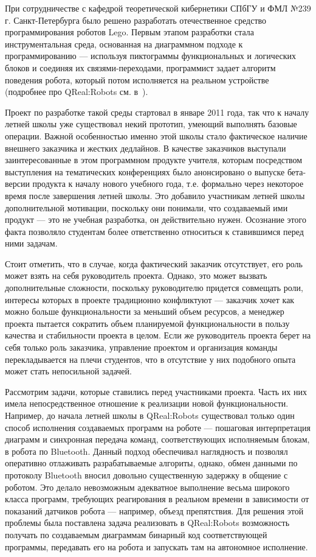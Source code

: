 \documentclass[a4paper]{article}
\begin{document}
При сотрудничестве с кафедрой теоретической кибернетики СПбГУ и ФМЛ №239 г. Санкт-Петербурга было решено разработать отечественное средство программирования роботов Lego. Первым этапом разработки стала инструментальная среда, основанная на диаграммном подходе к программированию --- используя пиктограммы функциональных и логических блоков и соединяя их связями-переходами, программист задает алгоритм поведения робота, который потом исполняется на реальном устройстве (подробнее про QReal:Robots см. в~\cite{robots}).

Проект по разработке такой среды стартовал в январе 2011 года, так что к началу летней школы уже существовал некий прототип, умеющий выполнять базовые операции. Важной особенностью именно этой школы стало фактическое наличие внешнего заказчика и жестких дедлайнов. В качестве заказчиков выступали заинтересованные в этом программном продукте учителя, которым посредством выступления на тематических конференциях было анонсировано о выпуске бета-версии продукта к началу нового учебного года, т.е. формально через некоторое время после завершения летней школы. Это добавило участникам летней школы дополнительной мотивации, поскольку они понимали, что создаваемый ими продукт --- это не учебная разработка, он действительно нужен. Осознание этого факта позволяло студентам более ответственно относиться к ставившимся перед ними задачам. 

Стоит отметить, что в случае, когда фактический заказчик отсутствует, его роль может взять на себя руководитель проекта. Однако, это может вызвать дополнительные сложности, поскольку руководителю придется совмещать роли, интересы которых в проекте традиционно конфликтуют --- заказчик хочет как можно больше функциональности за меньший объем ресурсов, а менеджер проекта пытается сократить объем планируемой функциональности в пользу качества и стабильности проекта в целом. Если же руководитель проекта берет на себя только роль заказчика, управление проектом и организация команды перекладывается на плечи студентов, что в отсутствие у них подобного опыта может стать непосильной задачей.

Рассмотрим задачи, которые ставились перед участниками проекта. Часть их них имела непосредственное отношение к реализации новой функциональности. Например, до начала летней школы в QReal:Robots существовал только один способ исполнения создаваемых программ на роботе --- пошаговая интерпретация диаграмм и синхронная передача команд, соответствующих исполняемым блокам, в робота по Bluetooth. Данный подход обеспечивал наглядность и позволял оперативно отлаживать разрабатываемые алгориты, однако, обмен данными по протоколу Bluetooth вносил довольно существенную задержку в общение с роботом. Это делало невозможным адекватное выполнение весьма широкого класса программ, требующих реагирования в реальном времени в зависимости от показаний датчиков робота --- например, объезд препятствия. Для решения этой проблемы была поставлена задача реализовать в QReal:Robots возможность получать по создаваемым диаграммам бинарный код соответствующей программы, передавать его на робота и запускать там на автономное исполнение.
\end{document}
